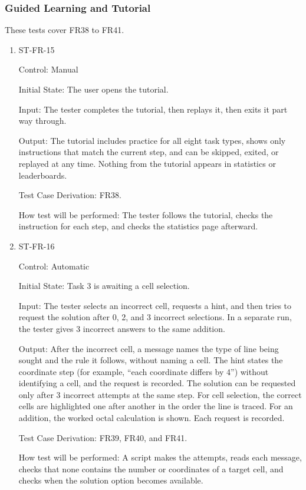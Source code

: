 \documentclass[12pt, titlepage]{article}
\begin{document}
\subsubsection{Guided Learning and Tutorial}

These tests cover FR38 to FR41.

\begin{enumerate}

\item{ST-FR-15\\}

Control: Manual

Initial State: The user opens the tutorial.

Input: The tester completes the tutorial, then replays it, then exits it part way through.

Output: The tutorial includes practice for all eight task types, shows only instructions that match the current step, and can be skipped, exited, or replayed at any time. Nothing from the tutorial appears in statistics or leaderboards.

Test Case Derivation: FR38.

How test will be performed: The tester follows the tutorial, checks the instruction for each step, and checks the statistics page afterward.

\item{ST-FR-16\\}

Control: Automatic

Initial State: Task 3 is awaiting a cell selection.

Input: The tester selects an incorrect cell, requests a hint, and then tries to request the solution after 0, 2, and 3 incorrect selections. In a separate run, the tester gives 3 incorrect answers to the same addition.

Output: After the incorrect cell, a message names the type of line being sought and the rule it follows, without naming a cell. The hint states the coordinate step (for example, ``each coordinate differs by 4'') without identifying a cell, and the request is recorded. The solution can be requested only after 3 incorrect attempts at the same step. For cell selection, the correct cells are highlighted one after another in the order the line is traced. For an addition, the worked octal calculation is shown. Each request is recorded.

Test Case Derivation: FR39, FR40, and FR41.

How test will be performed: A script makes the attempts, reads each message, checks that none contains the number or coordinates of a target cell, and checks when the solution option becomes available.

\end{enumerate}
\end{document}
